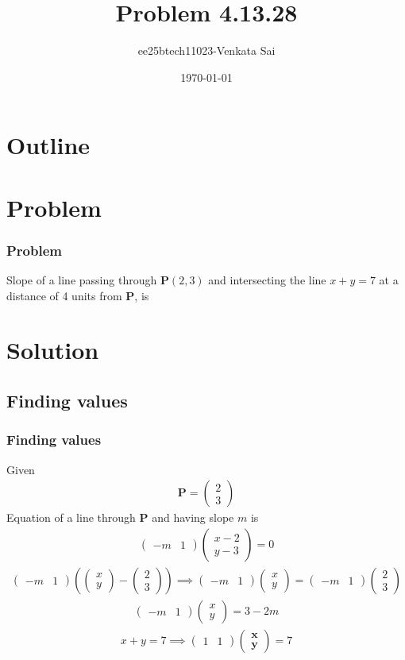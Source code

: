 \documentclass{beamer}
\title{Problem 4.13.28}
\author{ee25btech11023-Venkata Sai}
\date{\today}
\providecommand{\brak}[1]{\ensuremath{\left(#1\right)}}
\theoremstyle{remark}
\newcommand{\myvec}[1]{\ensuremath{\begin{pmatrix}#1\end{pmatrix}}}
\let\vec\mathbf
\numberwithin{equation}{section}
\begin{document}
\begin{frame}
\titlepage
\end{frame}

\section*{Outline}
\begin{frame}
\tableofcontents
\end{frame}

\section{Problem}

\begin{frame}
\frametitle{Problem}
\setcounter{section}{1}
Slope of a line passing through $\vec{P}\brak{2,3}$ and intersecting the line $x+y=7$ at a distance of 4 units from $\vec{P}$, is
\end{frame}
\section{Solution}

\subsection{Finding values}
\begin{frame}
\frametitle{Finding values}
Given  
\begin{align}
\vec{P}=\myvec{2\\3}
\end{align}
Equation of a line through $\vec{P}$ and having slope $m$ is
\begin{align}
 \myvec{-m & 1}\myvec{x-2 \\ y-3}=0  
 \end{align}
 \begin{align}
 \myvec{-m & 1}\brak{\myvec{x\\y}-\myvec{2\\3}} \implies \myvec{-m & 1}\myvec{x\\y}=\myvec{-m & 1}\myvec{2\\3}
\end{align}
\begin{align}
\myvec{-m & 1}\myvec{x\\y}=3-2m
\end{align}
\begin{align}
  x+y=7 \implies  \myvec{1 & 1}\myvec{\vec{x}\\\vec{y}}=7
\end{align}
\end{frame}
\end{document}
